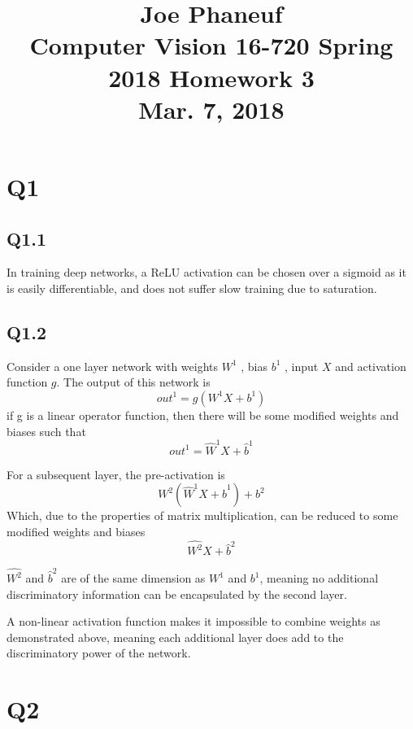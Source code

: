 \documentclass[12pt]{article}
\begin{document}
\title{Joe Phaneuf \\ Computer Vision 16-720 Spring 2018 Homework 3 \\ Mar. 7, 2018 }
\date{}
\author{}
\maketitle

\newpage


\section{Q1}
\subsection{Q1.1}
In training deep networks, a ReLU activation can be chosen over a sigmoid as it is easily differentiable, and does not suffer slow training due to saturation.

\subsection{Q1.2}
Consider a one layer network with weights $W^{1}$ , bias $b^{1}$ , input $X$ and activation function $g$. The output of this network is 
$$
out^{1} = g( W^{1} X + b^{1} )
$$
if g is a linear operator function, then there will be some modified weights and biases such that
$$
out^{1} = \hat{W}^{1} X + \hat{b}^{1}
$$

For a subsequent layer, the pre-activation is
$$
W^{2} ( \hat{W}^{1} X + \hat{b}^{1} ) + b^{2}
$$
Which, due to the properties of matrix multiplication, can be reduced to some modified weights and biases
$$
\hat { W^{2} } X + \hat { b} ^{2}
$$

$\hat { W^{2} }$ and $\hat { b} ^{2}$ are of the same dimension as $W^{1}$ and $b^{1}$, meaning no additional discriminatory information can be encapsulated by the second layer. 

A non-linear activation function makes it impossible to combine weights as demonstrated above, meaning each additional layer does add to the discriminatory power of the network.

\section{Q2}
\end{document}
